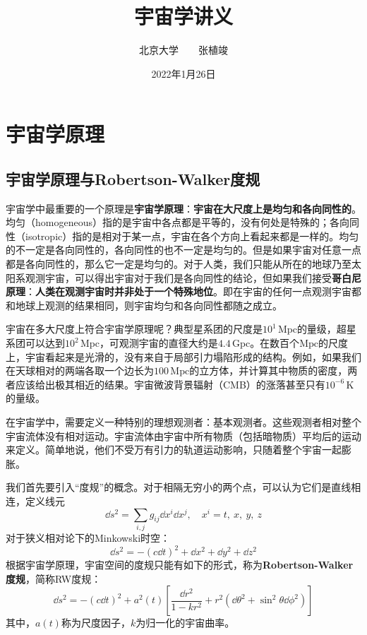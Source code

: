 \documentclass[fontset=none,openany,a4paper]{ctexbook}
\begin{document}
\title{\Huge\textbf{宇宙学讲义}}
\author{\kaishu\Large 北京大学\ \ \ \ 张植竣}
\date{\kaishu\Large 2022年1月26日}
\maketitle

\tableofcontents

\chapter{宇宙学原理}

\section{宇宙学原理与Robertson-Walker度规}

宇宙学中最重要的一个原理是\textbf{宇宙学原理}：\textbf{宇宙在大尺度上是均匀和各向同性的}。均匀（homogeneous）指的是宇宙中各点都是平等的，没有何处是特殊的；各向同性（isotropic）指的是相对于某一点，宇宙在各个方向上看起来都是一样的。均匀的不一定是各向同性的，各向同性的也不一定是均匀的。但是如果宇宙对任意一点都是各向同性的，那么它一定是均匀的。对于人类，我们只能从所在的地球乃至太阳系观测宇宙，可以得出宇宙对于我们是各向同性的结论，但如果我们接受\textbf{哥白尼原理}：\textbf{人类在观测宇宙时并非处于一个特殊地位}。即在宇宙的任何一点观测宇宙都和地球上观测的结果相同，则宇宙均匀和各向同性都随之成立。


宇宙在多大尺度上符合宇宙学原理呢？典型星系团的尺度是$10^1\,\mathrm{Mpc}$的量级，超星系团可以达到$10^2\,\mathrm{Mpc}$，可观测宇宙的直径大约是$4.4\,\mathrm{Gpc}$。在数百个$\mathrm{Mpc}$的尺度上，宇宙看起来是光滑的，没有来自于局部引力塌陷形成的结构。例如，如果我们在天球相对的两端各取一个边长为$100\,\mathrm{Mpc}$的立方体，并计算其中物质的密度，两者应该给出极其相近的结果。宇宙微波背景辐射（CMB）的涨落甚至只有$10^{-6}\,\mathrm{K}$的量级。

在宇宙学中，需要定义一种特别的理想观测者：基本观测者。这些观测者相对整个宇宙流体没有相对运动。宇宙流体由宇宙中所有物质（包括暗物质）平均后的运动来定义。简单地说，他们不受万有引力的轨道运动影响，只随着整个宇宙一起膨胀。

我们首先要引入“度规”的概念。对于相隔无穷小的两个点，可以认为它们是直线相连，定义线元
\begin{equation}
    \dd{s}^2 = \sum_{i,j}g_{ij} \dd{x}^i \dd{x}^j,\quad x^i = t,\ x,\ y,\ z
\end{equation}
对于狭义相对论下的Minkowski时空：
\begin{equation}
    \dd{s}^2 = -(c\dd{t})^2 + \dd{x}^2 + \dd{y}^2 + \dd{z}^2
\end{equation}
根据宇宙学原理，宇宙空间的度规只能有如下的形式，称为\textbf{Robertson-Walker度规}，简称RW度规：
\begin{equation}
    \dd{s}^2 = -(c\dd{t})^2 + a^2(t) \left[\frac{\dd{r}^2}{1 - kr^2} + r^2\left(\dd{\theta}^2 + \sin^2\theta \dd{\phi}^2\right)\right]
\end{equation}
其中，$a(t)$称为尺度因子，$k$为归一化的宇宙曲率。
\end{document}
